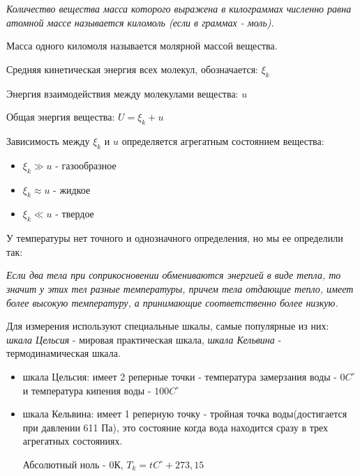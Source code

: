\documentclass[../main.tex]{subfiles}
\begin{document}
 \textit{Количество вещества масса которого выражена в килограммах численно равна атомной массе называется киломоль (если в граммах - моль).}

 Масса одного киломоля называется молярной массой вещества.

\vspace{5px}

Средняя кинетическая энергия всех молекул, обозначается: $\xi_k$

\vspace{5px}

Энергия взаимодействия между молекулами вещества: $u$

\vspace{5px}

Общая энергия вещества: $U = \xi_k + u$

\newpage

Зависимость между $\xi_k$ и $u$ определяется агрегатным состоянием вещества:
\begin{itemize}
    \item $\xi_k \gg u$ - газообразное
    \item $\xi_k \approx u$ - жидкое
    \item $\xi_k \ll u$ - твердое
\end{itemize}
У температуры нет точного и однозначного определения, но мы ее определили так:

\vspace{5px}

 \textit{ Если два тела при соприкосновении обмениваются энергией в виде тепла, то значит у этих тел разные температуры, причем тела отдающие тепло, имеет более высокую температуру, а принимающие соответственно более низкую.}

\vspace{5px}

Для измерения используют специальные шкалы, самые популярные из них: \textit{шкала Цельсия}  - мировая практическая шкала, \textit{шкала Кельвина} - термодинамическая шкала.
\begin{itemize}
    \item шкала Цельсия: имеет 2 реперные точки - температура замерзания воды - $0 C^{\circ}$ и температура кипения воды - $100 C^{\circ}$
    \item шкала Кельвина: имеет 1 реперную точку - тройная точка воды(достигается при давлении 611 Па), это состояние когда вода находится сразу в трех агрегатных состояниях.

          Абсолютный ноль - 0К, $T_k = tC^{\circ} + 273,15$
\end{itemize}
\end{document}
